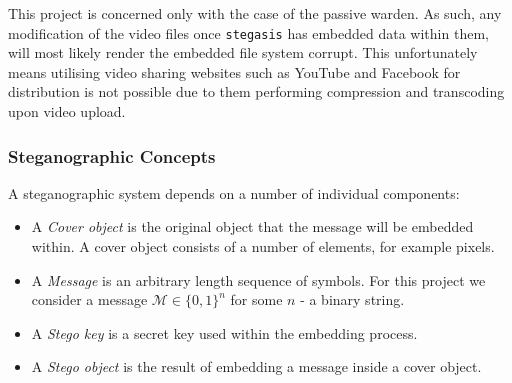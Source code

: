 \documentclass[paper=a4, fontsize=11pt,twoside]{scrartcl}
\numberwithin{table}{section}
\numberwithin{figure}{section}
\numberwithin{algorithm}{section}
\begin{document}
This project is concerned only with the case of the passive warden. As such, any modification of the video files once \texttt{stegasis} has embedded data within them, will most likely render the embedded file system corrupt. This unfortunately means utilising video sharing websites such as YouTube and Facebook for distribution is not possible due to them performing compression and transcoding upon video upload.

\subsubsection{Steganographic Concepts}
A steganographic system depends on a number of individual components:
\begin{itemize}
	\item A \textit{Cover object} is the original object that the message will be embedded within. A cover object consists of a number of elements, for example pixels.
	\item A \textit{Message} is an arbitrary length sequence of symbols. For this project we consider a message $\mathcal{M} \in \{0,1\}^{n} $ for some $n$ - a binary string.
	\item A \textit{Stego key} is a secret key used within the embedding process.
	\item A \textit{Stego object} is the result of embedding a message inside a cover object.
\end{itemize}
\end{document}
